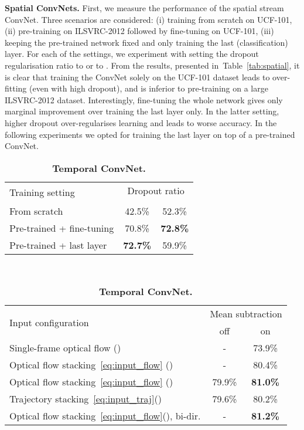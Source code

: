 \documentclass{article} \usepackage{nips14submit_e,times}
\newcommand{\tblref}[1]{Table~\ref{#1}}
\begin{document}
\noindent\textbf{Spatial ConvNets.}
First, we measure the performance of the spatial stream ConvNet.
Three scenarios are considered:
(i) training from scratch on UCF-101, 
(ii) pre-training on ILSVRC-2012 followed by fine-tuning on UCF-101, 
(iii) keeping the pre-trained network fixed and only training the last (classification) layer.  
For each of the settings, we experiment with setting the dropout
regularisation ratio to  or to .  
From the results,
presented in~\tblref{tab:spatial}, it is clear that training the
ConvNet solely on the UCF-101 dataset leads to over-fitting (even with
high dropout), and is inferior to pre-training on a large ILSVRC-2012
dataset. Interestingly, fine-tuning the whole network gives only
marginal improvement over training the last layer only.
In the latter setting, higher dropout over-regularises learning and leads to worse accuracy. 
In the following experiments we opted for training the last layer on top of a pre-trained ConvNet.
\begin{table}[ht]
\setlength{\tabcolsep}{4pt}
\small
\caption{\textbf{Individual ConvNets accuracy on UCF-101 (split 1).}}
\begin{subtable}{.4\textwidth}
\vspace{-2em}
\centering
\caption{\textbf{Spatial ConvNet.}}
\begin{tabular}{|l|c|c|} \hline
\multirow{2}{*}{Training setting} & \multicolumn{2}{c|}{Dropout ratio} \\ \cline{2-3}
 &  &   \\ \hline
From scratch & 42.5\%  & 52.3\% \\ \hline
Pre-trained + fine-tuning & 70.8\%  & \textbf{72.8\%}  \\ \hline
Pre-trained + last layer & \textbf{72.7\%} & 59.9\%  \\ \hline
\end{tabular}
\label{tab:spatial}
\end{subtable}
~~~
\begin{subtable}{.6\textwidth}
\centering
\caption{\textbf{Temporal ConvNet.}}
\begin{tabular}{|l|c|c|} \hline
\multirow{2}{*}{Input configuration} & \multicolumn{2}{c|}{Mean subtraction} \\ \cline{2-3}
 & off & on  \\ \hline
Single-frame optical flow () & - & 73.9\% \\ \hline
Optical flow stacking~\eqref{eq:input_flow} () & - & 80.4\% \\ \hline
Optical flow stacking~\eqref{eq:input_flow} () & 79.9\% & \textbf{81.0\%} \\ \hline
Trajectory stacking~\eqref{eq:input_traj}() & 79.6\% & 80.2\% \\ \hline
Optical flow stacking~\eqref{eq:input_flow}(), bi-dir.  & - & \textbf{81.2\%} \\ \hline
\end{tabular}
\label{tab:temporal}
\end{subtable}
\end{table}
\end{document}

